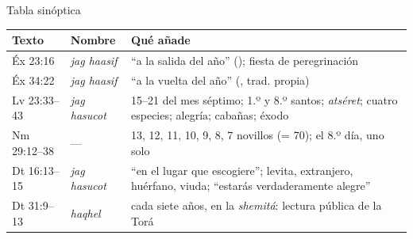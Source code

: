 \begin{frame}{Tabla sinóptica}
\scriptsize\renewcommand{\arraystretch}{1.15}
\begin{tabular}{@{}L{1.8cm}L{2.5cm}L{7.6cm}@{}}
\toprule
\textbf{Texto} & \textbf{Nombre} & \textbf{Qué añade} \\ \midrule
Éx 23:16 & \emph{jag haasif} & ``a la salida del año'' (); fiesta de peregrinación \\
Éx 34:22 & \emph{jag haasif} & ``a la vuelta del año'' (, trad. propia) \\
Lv 23:33--43 & \emph{jag hasucot} & 15--21 del mes séptimo; 1.º y 8.º santos; \emph{atséret}; cuatro especies; alegría; cabañas; éxodo \\
Nm 29:12--38 & --- & 13, 12, 11, 10, 9, 8, 7 novillos (= 70); el 8.º día, uno solo \\
Dt 16:13--15 & \emph{jag hasucot} & ``en el lugar que \SENOR{} escogiere''; levita, extranjero, huérfano, viuda; ``estarás verdaderamente alegre'' \\
Dt 31:9--13 & \emph{haqhel} & cada siete años, en la \emph{shemitá}: lectura pública de la Torá \\
\bottomrule
\end{tabular}\par\medskip
{}
\end{frame}

